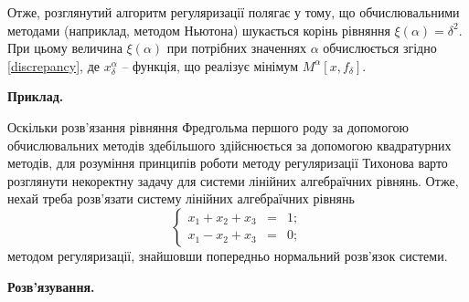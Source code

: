 \documentclass[14pt,twoside]{extreport}
\theoremstyle{mystyle}
\numberwithin{equation}{chapter}
\begin{document}
Отже, розглянутий алгоритм регуляризації полягає у тому, що обчислювальними методами (наприклад, методом Ньютона) шукається корінь рівняння $\xi(\alpha) = \delta^2$. При цьому величина $\xi(\alpha)$ при потрібних значеннях $\alpha$ обчислюється згідно \eqref{discrepancy}, де $x_\delta^\alpha$ -- функція, що реалізує мінімум $M^{\alpha}[x, f_\delta]$.

\begin{small}
 \textbf{Приклад.}

Оскільки розв'язання рівняння Фредгольма першого роду за допомогою обчислювальних методів здебільшого здійснюється за допомогою квадратурних методів, для розуміння принципів роботи методу регуляризації Тихонова варто розглянути некоректну задачу для системи лінійних алгебраїчних рівнянь. Отже, нехай треба розв'язати систему лінійних алгебраїчних рівнянь
\[
\left\{
\begin{array}{lll}
 x_1 + x_2 + x_3 &=& 1;\\
 x_1 - x_2 + x_3 &=& 0;
\end{array}
\right.
\]
методом регуляризації, знайшовши попередньо нормальний розв'язок системи.

\textbf{Розв'язування.}


\end{small}
\end{document}

